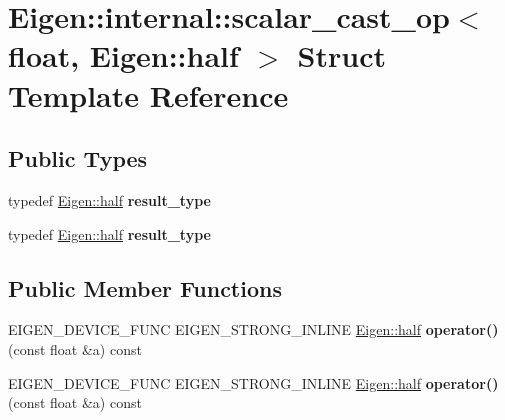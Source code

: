 \hypertarget{struct_eigen_1_1internal_1_1scalar__cast__op_3_01float_00_01_eigen_1_1half_01_4}{}\section{Eigen\+:\+:internal\+:\+:scalar\+\_\+cast\+\_\+op$<$ float, Eigen\+:\+:half $>$ Struct Template Reference}
\label{struct_eigen_1_1internal_1_1scalar__cast__op_3_01float_00_01_eigen_1_1half_01_4}
\subsection*{Public Types}
\begin{DoxyCompactItemize}
\item 
\mbox{\label{struct_eigen_1_1internal_1_1scalar__cast__op_3_01float_00_01_eigen_1_1half_01_4_a66542585946e4e24748a6460f1e315bc}} 
typedef \hyperlink{struct_eigen_1_1half}{Eigen\+::half} {\bfseries result\+\_\+type}
\item 
\mbox{\label{struct_eigen_1_1internal_1_1scalar__cast__op_3_01float_00_01_eigen_1_1half_01_4_a66542585946e4e24748a6460f1e315bc}} 
typedef \hyperlink{struct_eigen_1_1half}{Eigen\+::half} {\bfseries result\+\_\+type}
\end{DoxyCompactItemize}
\subsection*{Public Member Functions}
\begin{DoxyCompactItemize}
\item 
\mbox{\label{struct_eigen_1_1internal_1_1scalar__cast__op_3_01float_00_01_eigen_1_1half_01_4_a660d04ab9854a3de5beed9f4ec23e2e0}} 
E\+I\+G\+E\+N\+\_\+\+D\+E\+V\+I\+C\+E\+\_\+\+F\+U\+NC E\+I\+G\+E\+N\+\_\+\+S\+T\+R\+O\+N\+G\+\_\+\+I\+N\+L\+I\+NE \hyperlink{struct_eigen_1_1half}{Eigen\+::half} {\bfseries operator()} (const float \&a) const
\item 
\mbox{\label{struct_eigen_1_1internal_1_1scalar__cast__op_3_01float_00_01_eigen_1_1half_01_4_a660d04ab9854a3de5beed9f4ec23e2e0}} 
E\+I\+G\+E\+N\+\_\+\+D\+E\+V\+I\+C\+E\+\_\+\+F\+U\+NC E\+I\+G\+E\+N\+\_\+\+S\+T\+R\+O\+N\+G\+\_\+\+I\+N\+L\+I\+NE \hyperlink{struct_eigen_1_1half}{Eigen\+::half} {\bfseries operator()} (const float \&a) const
\end{DoxyCompactItemize}


